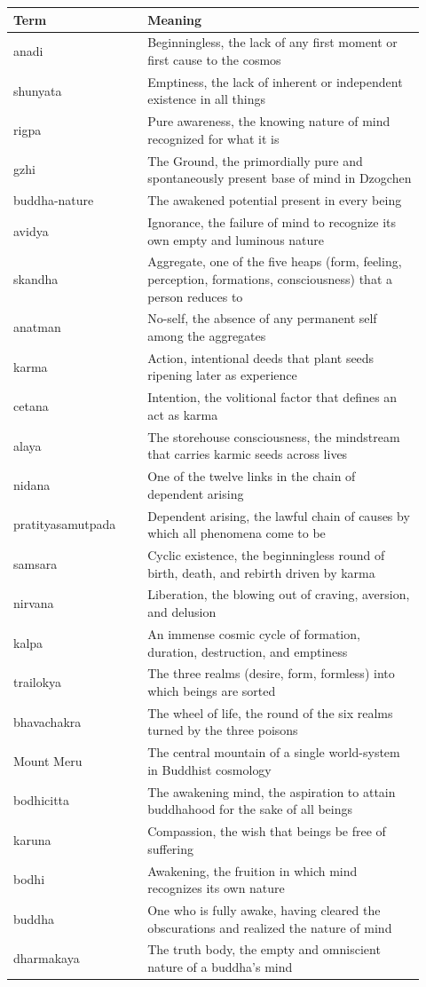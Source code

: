 \begin{longtable}{L{0.30\linewidth} L{0.62\linewidth}}
\toprule
\textbf{Term} & \textbf{Meaning} \\
\midrule
\endhead
anadi & Beginningless, the lack of any first moment or first cause to the cosmos \\
shunyata & Emptiness, the lack of inherent or independent existence in all things \\
rigpa & Pure awareness, the knowing nature of mind recognized for what it is \\
gzhi & The Ground, the primordially pure and spontaneously present base of mind in Dzogchen \\
buddha-nature & The awakened potential present in every being \\
avidya & Ignorance, the failure of mind to recognize its own empty and luminous nature \\
skandha & Aggregate, one of the five heaps (form, feeling, perception, formations, consciousness) that a person reduces to \\
anatman & No-self, the absence of any permanent self among the aggregates \\
karma & Action, intentional deeds that plant seeds ripening later as experience \\
cetana & Intention, the volitional factor that defines an act as karma \\
alaya & The storehouse consciousness, the mindstream that carries karmic seeds across lives \\
nidana & One of the twelve links in the chain of dependent arising \\
pratityasamutpada & Dependent arising, the lawful chain of causes by which all phenomena come to be \\
samsara & Cyclic existence, the beginningless round of birth, death, and rebirth driven by karma \\
nirvana & Liberation, the blowing out of craving, aversion, and delusion \\
kalpa & An immense cosmic cycle of formation, duration, destruction, and emptiness \\
trailokya & The three realms (desire, form, formless) into which beings are sorted \\
bhavachakra & The wheel of life, the round of the six realms turned by the three poisons \\
Mount Meru & The central mountain of a single world-system in Buddhist cosmology \\
bodhicitta & The awakening mind, the aspiration to attain buddhahood for the sake of all beings \\
karuna & Compassion, the wish that beings be free of suffering \\
bodhi & Awakening, the fruition in which mind recognizes its own nature \\
buddha & One who is fully awake, having cleared the obscurations and realized the nature of mind \\
dharmakaya & The truth body, the empty and omniscient nature of a buddha's mind \\
\bottomrule
\end{longtable}
